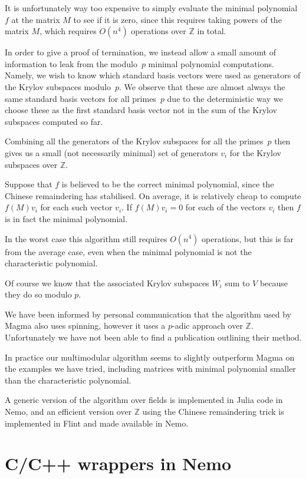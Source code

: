 \documentclass{sig-alternate-05-2015}
\begin{document}
It is unfortunately way too expensive to simply evaluate the minimal
polynomial $f$ at the matrix $M$ to see if it is zero, since this requires
taking powers of the matrix $M$, which requires $O(n^4)$ operations over
$\mathbb{Z}$ in total.

In order to give a proof of termination, we instead allow a small amount of
information to leak from the modulo~$p$ minimal polynomial computations.
Namely, we wish to know which standard basis vectors were used as
generators of the Krylov subspaces modulo~$p$. We observe that these are
almost always the same standard basis vectors for all primes~$p$ due to the
deterministic way we choose these as the first standard basis vector not
in the sum of the Krylov subspaces computed so far. 

Combining all the generators of the Krylov subspaces for all the primes~$p$
then gives us a small (not necessarily minimal) set of generators $v_i$
for the Krylov subspaces over $\mathbb{Z}$.

Suppose that $f$ is believed to be the correct minimal polynomial,
since the Chinese remaindering has stabilised.
On average, it is relatively cheap to compute $f(M)v_i$ for each such
vector $v_i$. If $f(M)v_i = 0$ for each of the vectors $v_i$ then $f$ is
in fact the minimal polynomial.

In the worst case this algorithm still requires $O(n^4)$ operations, but
this is far from the average case, even when the minimal polynomial is not
the characteristic polynomial.

Of course we know that the associated Krylov subspaces $W_i$ sum to $V$
because they do so modulo $p$.

We have been informed by personal communication that the algorithm used by
Magma \cite{magma} also uses spinning, however it uses a $p$-adic
approach over $\mathbb{Z}$. Unfortunately we have not been able to find a
publication outlining their method.

In practice our multimodular algorithm seems to slightly outperform Magma on the
examples we have tried, including matrices with minimal polynomial smaller 
than the characteristic polynomial.

A generic version of the algorithm over fields is implemented in Julia code in
Nemo, and an efficient version over $\mathbb{Z}$ using the Chinese remaindering
trick is implemented in Flint and made available in Nemo.

\section{C/C++ wrappers in Nemo}
\label{sect:wrappers}
\end{document}
